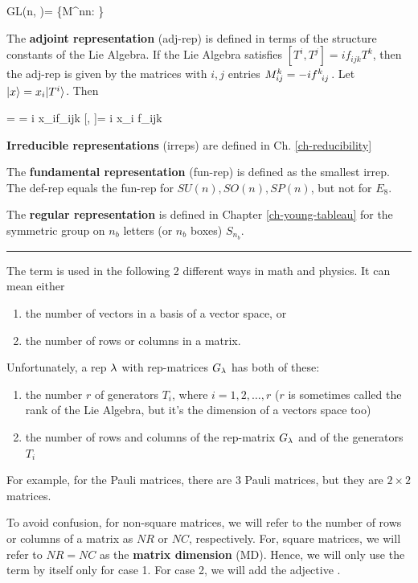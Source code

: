 \beq
GL(n, \CC)=
\{M\in \CC^{n\times n}: \}
\eeq

The {\bf adjoint representation} (adj-rep)
is defined in terms of the structure constants
of the Lie Algebra. If the Lie Algebra satisfies
$[T^i, T^j]= if_{ijk}T^k$,
then the adj-rep is given by the matrices
with $i,j$ entries $M^k_{ij}=-if\indices{^k_i_j}$.
Let  $|x\rangle = x_i |T^i\rangle$.
Then

   = 
\ket{[x, T^j]}= i x_if_{ijk} \implies
{}[, \cdot]= 
i x_i f_{ijk}
\eeq


{\bf Irreducible representations} (irreps)
are defined in Ch. \ref{ch-reducibility}

The {\bf fundamental representation} (fun-rep)
is defined as the smallest irrep.
The def-rep equals the fun-rep for
$SU(n), SO(n), SP(n)$, but not for $E_8$.

The {\bf regular representation}
is defined in Chapter \ref{ch-young-tableau}
 for the symmetric group on $n_b$
letters (or $n_b$ boxes) $S_{n_b}$.

\hrule
The term 
is used in the following 2 different ways in
math and physics. It can mean
either 
\begin{enumerate}
\item the number of vectors
in a basis of a vector space,
or 
\item
the number of rows or columns
in a matrix.
\end{enumerate}
Unfortunately,
a rep $\lambda$ with 
rep-matrices $G_\lambda$
has both of these: 
\begin{enumerate}
\item the number $r$ of generators $T_i$, where $i=1,2, \ldots, r$ ($r$ is sometimes called
the rank of the Lie Algebra, but it's the dimension of a
vectors space too)
\item \label{it-md}
the number of rows and columns
of the rep-matrix $G_\lambda$
and of the generators $T_i$
\end{enumerate}
For example,
for the Pauli matrices,
there are 3 Pauli matrices,
but they are $2\times 2$ matrices.

To avoid confusion, 
for non-square matrices, we will
refer to the number
of rows or columns of a 
matrix as $NR$ or $NC$,
respectively.
For, square matrices,
we will refer to $NR=NC$ as 
 the {\bf matrix dimension} (MD).
Hence, we will only use
the term  
by itself only for case 1.
For case 2, we will
add the adjective .

